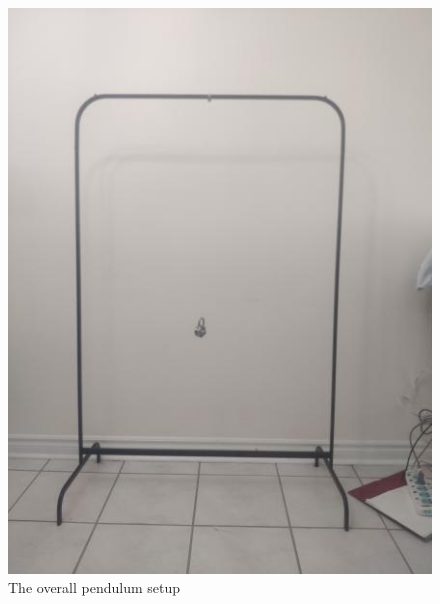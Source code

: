 \documentclass[12pt]{article}
\begin{document}
\begin{figure}[!htb]
\includegraphics[width=\linewidth]{img-setup.jpg}
\caption{The overall pendulum setup}\label{fig:setup}
\endminipage\hfill
{}

\end{figure}
\end{document}
